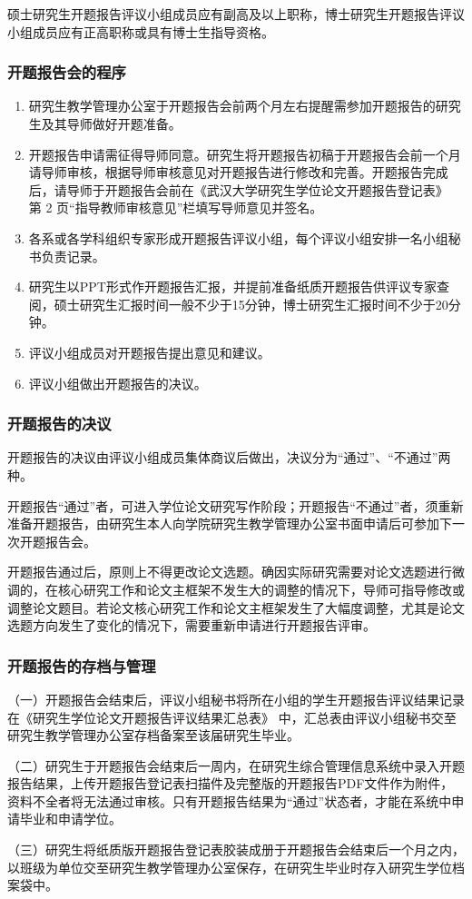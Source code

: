 硕士研究生开题报告评议小组成员应有副高及以上职称，博士研究生开题报告评议小组成员应有正高职称或具有博士生指导资格。


\subsubsection{开题报告会的程序}


\begin{enumerate}
  \item 研究生教学管理办公室于开题报告会前两个月左右提醒需参加开题报告的研究生及其导师做好开题准备。
  \item 开题报告申请需征得导师同意。研究生将开题报告初稿于开题报告会前一个月请导师审核，根据导师审核意见对开题报告进行修改和完善。开题报告完成后，请导师于开题报告会前在《武汉大学研究生学位论文开题报告登记表》\cite{研究生学位论文开题报告登记表} 第 2 页“指导教师审核意见”栏填写导师意见并签名。
  \item 各系或各学科组织专家形成开题报告评议小组，每个评议小组安排一名小组秘书负责记录。
  \item 研究生以PPT形式作开题报告汇报，并提前准备纸质开题报告供评议专家查阅，硕士研究生汇报时间一般不少于15分钟，博士研究生汇报时间不少于20分钟。
  \item 评议小组成员对开题报告提出意见和建议。
  \item 评议小组做出开题报告的决议。
\end{enumerate}


\subsubsection{开题报告的决议}

开题报告的决议由评议小组成员集体商议后做出，决议分为“通过”、“不通过”两种。

开题报告“通过”者，可进入学位论文研究写作阶段；开题报告“不通过”者，须重新准备开题报告，由研究生本人向学院研究生教学管理办公室书面申请后可参加下一次开题报告会。

开题报告通过后，原则上不得更改论文选题。确因实际研究需要对论文选题进行微调的，在核心研究工作和论文主框架不发生大的调整的情况下，导师可指导修改或调整论文题目。若论文核心研究工作和论文主框架发生了大幅度调整，尤其是论文选题方向发生了变化的情况下，需要重新申请进行开题报告评审。


\subsubsection{开题报告的存档与管理}

（一）开题报告会结束后，评议小组秘书将所在小组的学生开题报告评议结果记录在《研究生学位论文开题报告评议结果汇总表》\cite{研究生学位论文开题报告登记表} 中，汇总表由评议小组秘书交至研究生教学管理办公室存档备案至该届研究生毕业。

（二）研究生于开题报告会结束后一周内，在研究生综合管理信息系统中录入开题报告结果，上传开题报告登记表扫描件及完整版的开题报告PDF文件作为附件，资料不全者将无法通过审核。只有开题报告结果为“通过”状态者，才能在系统中申请毕业和申请学位。

（三）研究生将纸质版开题报告登记表胶装成册于开题报告会结束后一个月之内，以班级为单位交至研究生教学管理办公室保存，在研究生毕业时存入研究生学位档案袋中。